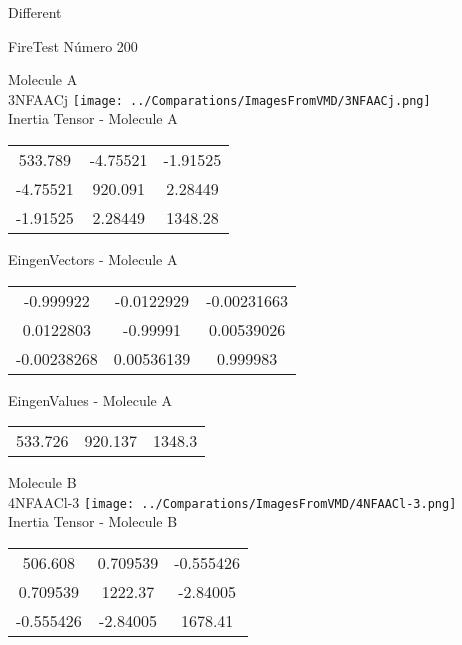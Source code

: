 \begin{center}
\vtab
\vtab
\textcolor{NavyBlue}{\Large Different}
\end{center}

 \newpage

\vtab[-2cm]
\begin{center}
{\large FireTest \tab Número 200}
\end{center}
\begin{multicols}{2}
\begin{center}

Molecule A \\ 
3NFAACj
\texttt{[image: ../Comparations/ImagesFromVMD/3NFAACj.png]}
\\
Inertia Tensor - Molecule A \\
\vtab

\begin{tabular}{|c c c|}
533.789	 & 	-4.75521	 & 	-1.91525	 \\
-4.75521	 & 	920.091	 & 	2.28449	 \\
-1.91525	 & 	2.28449	 & 	1348.28
\end{tabular}

\vtab
 EingenVectors - Molecule A     \\
\vtab
\begin{tabular}{|c c c|}
-0.999922	 & 	-0.0122929	 & 	-0.00231663	 \\
0.0122803	 & 	-0.99991	 & 	0.00539026	 \\
-0.00238268	 & 	0.00536139	 & 	0.999983
\end{tabular}

\vtab
 EingenValues - Molecule A     \\
\vtab
\begin{tabular}{|c c c|}
533.726	 & 	920.137	 & 	1348.3	 \\
\end{tabular}
\columnbreak

Molecule B \\ 
4NFAACl-3
\texttt{[image: ../Comparations/ImagesFromVMD/4NFAACl-3.png]}
\\
Inertia Tensor - Molecule B \\
\vtab

\begin{tabular}{|c c c|}
506.608	 & 	0.709539	 & 	-0.555426	 \\
0.709539	 & 	1222.37	 & 	-2.84005	 \\
-0.555426	 & 	-2.84005	 & 	1678.41
\end{tabular}


\end{center}
\end{multicols}
